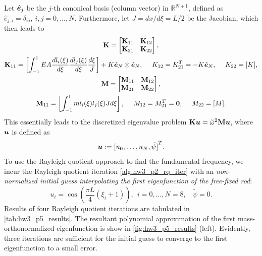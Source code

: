 \begin{enumerate}[(i)]
{    Let $\hat{\bm{e}}_j$ be the $j$-th canonical basis (column vector) in $\mathbb{R}^{N+1}$, defined as $\hat{e}_{j,i} = \delta_{ij}, ~i,j=0, \ldots, N$. 
    Furthermore, let $J = dx/d\xi = L/2$ be the Jacobian, which then leads to 
    \begin{equation}
    \begin{gathered}
        \mathbf{K} = \begin{bmatrix}
            \mathbf{K}_{11} & \mathbf{K}_{12} \\
            \mathbf{K}_{21} & \mathbf{K}_{22}
        \end{bmatrix},  \\
        \mathbf{K}_{11} = \left[\int_{-1}^1 EA \frac{d l_i(\xi)}{d\xi} \frac{d l_j(\xi)}{d\xi}\frac{d\xi}{J}  \right]  + K\hat{\bm{e}}_{N} \otimes \hat{\bm{e}}_{N}, ~~~~ K_{12} = K_{21}^T = -K \hat{\bm{e}}_{N}, ~~~~ K_{22} = [K], \\
        \mathbf{M} = \begin{bmatrix}
            \mathbf{M}_{11} & \mathbf{M}_{12} \\
            \mathbf{M}_{21} & \mathbf{M}_{22}
        \end{bmatrix},  \\
        \mathbf{M}_{11} = \left[\int_{-1}^1 m l_i(\xi) l_j(\xi) J d\xi  \right], ~~~~ M_{12} = M_{21}^T = \bm{0}, ~~~~ M_{22} = [M].
    \end{gathered}
    \end{equation}
    This essentially leads to the discretized eigenvalue problem $\mathbf{K}\bm{u} = \tilde{\omega}^2 \mathbf{M} \bm{u}$, where $\bm{u}$ is defined as 
    \begin{equation}
        \bm{u} := {[u_0, \ldots, u_N, \tilde{\psi}]}^T.
    \end{equation}
    To use the Rayleigh quotient approach to find the fundamental frequency, we incur the Rayleigh quotient iteration \cref{alg:hw3_p2_rq_iter} with an \emph{non-normalized initial guess interpolating the first eigenfunction of the free-fixed rod}:
    \begin{equation}
        u_i = \cos\left(\frac{\pi L}{4}(\xi_i + 1)\right), ~~ i = 0, \ldots, N=8, ~~~~ \tilde{\psi} = 0.
    \end{equation}
    Results of four Rayleigh quotient iterations are tabulated in \cref{tab:hw3_p5_results}.
    The resultant polynomial approximation of the first mass-orthonormalized eigenfunction is show in \cref{fig:hw3_p5_results} (left).
    Evidently, three iterations are sufficient for the initial guess to converge to the first eigenfunction to a small error. 
}
\end{enumerate}
